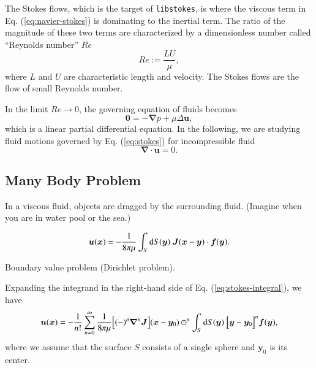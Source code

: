 \documentclass{book}
\begin{document}
The Stokes flows, which is the target of {\tt libstokes},
is where the viscous term in Eq. (\ref{eq:navier-stokes})
is dominating to the inertial term.
The ratio of the magnitude of these two terms are characterized
by a dimensionless number called ``Reynolds number'' $Re$
\begin{equation}
  Re
  :=
  \frac{LU}{\mu}
  ,
\end{equation}
where $L$ and $U$ are characteristic length and velocity.
The Stokes flows are the flow of small Reynolds number.

In the limit $Re\rightarrow 0$,
the governing equation of fluids becomes
\begin{equation}
  \bm{0}
  =
  -
  \bm{\nabla}
  p
  +
  \mu
  \Delta
  \bm{u}
  ,
  \label{eq:stokes}
\end{equation}
which is a linear partial differential equation.
In the following, we are studying fluid motions
governed by Eq. (\ref{eq:stokes})
for incompressible fluid
\begin{equation}
  \bm{\nabla}
  \cdot
  \bm{u}
  =
  0
  .
\end{equation}


\subsection{Many Body Problem}
In a viscous fluid, objects are dragged by the surrounding fluid.
(Imagine when you are in water pool or the sea.)


\begin{equation}
  \bm{u}
  (\bm{x})
  =
  -
  \frac{1}{8\pi\mu}
  \int_S
  {\rm d}S(\bm{y})\ 
  \bm{J}(\bm{x}-\bm{y})
  \cdot
  \bm{f}(\bm{y})
  .
  \label{eq:stokes-integral}
\end{equation}

Boundary value problem (Dirichlet problem).

Expanding the integrand in the right-hand side
of Eq. (\ref{eq:stokes-integral}),
we have
\begin{equation}
  \bm{u}
  (\bm{x})
  =
  -
  \frac{1}{n!}
  \sum_{n=0}^{\infty}
  \frac{1}{8\pi\mu}
  \Bigl[
    (-)^n
    \bm{\nabla}^n
    \bm{J}
  \Bigr]
  (\bm{x}-\bm{y}_0)
  \odot^n
  \int_S
  {\rm d}S(\bm{y})\ 
  \Bigl[
    \bm{y}
    -
    \bm{y}_0
  \Bigr]^n
  \bm{f}(\bm{y})
  ,
\end{equation}
where we assume that the surface $S$ consists of a single sphere
and $\bm{y}_0$ is its center.
\end{document}

